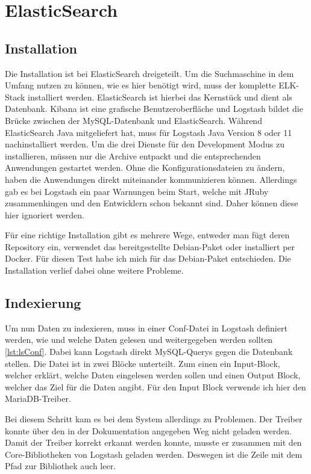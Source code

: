 
\section{ElasticSearch}

\subsection{Installation}

Die Installation ist bei ElasticSearch dreigeteilt. Um die Suchmaschine in dem Umfang nutzen zu können, wie es hier benötigt wird, muss der komplette ELK-Stack installiert werden. ElasticSearch ist hierbei das Kernstück und dient als Datenbank. Kibana ist eine grafische Benutzeroberfläche und Logstash bildet die Brücke zwischen der MySQL-Datenbank und ElasticSearch. Während ElasticSearch Java mitgeliefert hat, muss für Logstash Java Version 8 oder 11 nachinstalliert werden. Um die drei Dienste für den Development Modus zu installieren, müssen nur die Archive entpackt und die entsprechenden Anwendungen gestartet werden. Ohne die Konfigurationsdateien zu ändern, haben die Anwendungen direkt miteinander kommunizieren können. Allerdings gab es bei Logstash ein paar Warnungen beim Start, welche mit JRuby zusammenhingen und den Entwicklern schon bekannt sind. Daher können diese hier ignoriert werden.

Für eine richtige Installation gibt es mehrere Wege, entweder man fügt deren Repository ein, verwendet das bereitgestellte Debian-Paket oder installiert per Docker. Für diesen Test habe ich mich für das Debian-Paket entschieden. Die Installation verlief dabei ohne weitere Probleme.

\subsection{Indexierung}

Um nun Daten zu indexieren, muss in einer Conf-Datei in Logstash definiert werden, wie und welche Daten gelesen und weitergegeben werden sollten \ref{lst:lsConf}. Dabei kann Logstash direkt MySQL-Querys gegen die Datenbank stellen. Die Datei ist in zwei Blöcke unterteilt. Zum einen ein Input-Block, welcher erklärt, welche Daten eingelesen werden sollen und einen Output Block, welcher das Ziel für die Daten angibt. Für den Input Block verwende ich hier den MariaDB-Treiber.

Bei diesem Schritt kam es bei dem System allerdings zu Problemen. Der Treiber konnte über den in der Dokumentation angegeben Weg nicht geladen werden.  Damit der Treiber korrekt erkannt werden konnte, musste er zusammen mit den Core-Bibliotheken von Logstash geladen werden. Deswegen ist die Zeile mit dem Pfad zur Bibliothek auch leer. 

